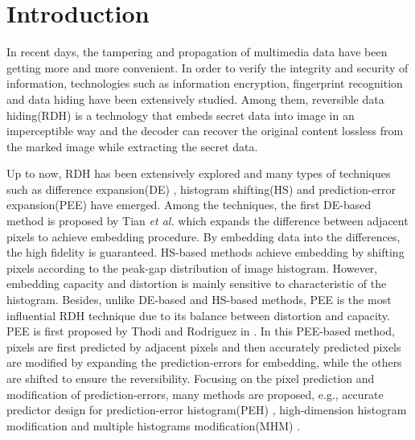 \documentclass[review,3p,10pt,sort&compress]{elsarticle}
\begin{document}
\section{Introduction}\label{sec:1}
In recent days, the tampering and propagation of multimedia data have been getting more and more convenient. In order to verify the integrity and security of information, technologies such as information encryption, fingerprint recognition and data hiding have been extensively studied. Among them, reversible data hiding(RDH) is a technology that embeds secret data into image in an imperceptible way and the decoder can recover the original content lossless from the marked image while extracting the secret data.

Up to now, RDH has been extensively explored and many types of techniques such as difference expansion(DE) \cite{
Tian2003DE,
Qin2013An,
Thodi2007Expansion,
Hu2009DE,
Li2013A},
histogram shifting(HS) \cite{
Hong2009Reversible,
Hong2010A,
Xiaolong2013General,
Wang2018A}
and prediction-error expansion(PEE) \cite{
Sachnev2009Reversible,
Tsai2009Reversible,
Gao2011Lossless,
Li2011Efficient,
Hong2011Adaptive,
Wu2012Reversible,
Qin2013An,
Ou2013Pairwise,
Dragoi2014Local,
Li2015Efficient,
Dragoi2016Adaptive,
Wang2017Rate}
have emerged. Among the techniques, the first DE-based method is proposed by Tian \emph{et al.} \cite{Tian2003DE} which expands the difference between adjacent pixels to achieve embedding procedure. By embedding data into the differences, the high fidelity is guaranteed. HS-based methods achieve embedding by shifting pixels according to the peak-gap distribution of image histogram. However, embedding capacity and distortion is mainly sensitive to characteristic of the histogram. Besides, unlike DE-based and HS-based methods, PEE is the most influential RDH technique due to its balance between distortion and capacity. PEE is first proposed by Thodi and Rodriguez in \cite{Thodi2007Expansion}. In this PEE-based method, pixels are first predicted by adjacent pixels and then accurately predicted pixels are modified by expanding the prediction-errors for embedding, while the others are shifted to ensure the reversibility. Focusing on the pixel prediction and modification of prediction-errors, many methods are proposed, e.g., accurate predictor design for prediction-error histogram(PEH) \cite{Thodi2007Expansion,Fallahpour2008Reversible,Hu2009DE,Hong2009Reversible,Sachnev2009Reversible,Ioan2014Local,Ioan2015On}, high-dimension histogram modification \cite{Ou2013Pairwise,Li2013A,Dragoi2016Adaptive} and multiple histograms modification(MHM) \cite{Li2015Efficient,Xiang2015A,Bo2016Improved}.
\end{document}

